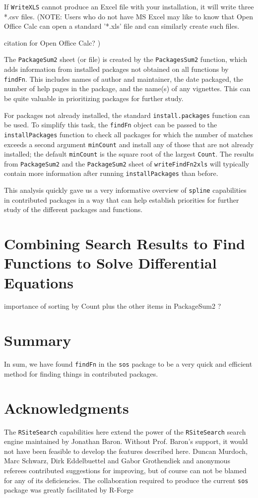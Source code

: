 If {\tt WriteXLS} cannot produce an Excel file with your
installation, it will write three *.csv files.  (NOTE:
Users who do not have MS Excel may like to know that
Open Office Calc can open a standard '*.xls' file and
can similarly create such files.


citation for Open Office Calc?
)

The {\tt PackageSum2} sheet (or file) is created by the
{\tt PackagesSum2} function, which adds information from
installed packages not obtained on all functions by
{\tt findFn}.  This includes names of author and maintainer,
the date packaged, the number of help pages in the package,
and the name(s) of any vignettes.  This can be quite
valuable in prioritizing packages for further study.

For packages not already installed, the standard
{\tt install.packages} function can be used.  To simplify this
task, the {\tt findFn} object can be passed to the
{\tt installPackages} function to check all packages for which
the number of matches exceeds a second argument {\tt minCount}
and install any of those that are not already installed;  the
default {\tt minCount} is the square root of the largest
{\tt Count}.  The results from {\tt PackageSum2} and the
{\tt PackageSum2} sheet of {\tt writeFindFn2xls} will typically
contain more information after running {\tt installPackages}
than before.

This analysis quickly gave us a very informative overview of
{\tt spline} capabilities in contributed \R{} packages in a way
that can help establish priorities for further study of the
different packages and functions.

\section*{Combining Search Results to Find Functions to Solve Differential Equations}


importance of sorting by Count plus the other items
in PackageSum2  ?



\section*{Summary}
In sum, we have found {\tt findFn} in the {\tt sos} package to
be a very quick and efficient method for finding things in
contributed packages.

\section*{Acknowledgments}
The {\tt RSiteSearch} capabilities here extend the power of the
{\tt RSiteSearch} search engine maintained by Jonathan Baron.
Without Prof. Baron's support, it would not have been feasible
to develop the features described here.  Duncan Murdoch, Marc Schwarz,
Dirk Eddelbuettel and Gabor Grothendiek and anonymous
referees contributed suggestions for improving, but of course
can not be blamed for any of its deficiencies.  The collaboration
required to produce the current {\tt sos} package was greatly
facilitated by R-Forge

